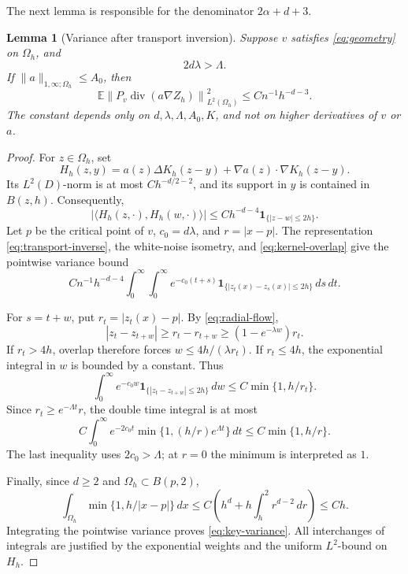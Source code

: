 \documentclass[11pt]{article}
\newtheorem{lemma}[theorem]{Lemma}
\theoremstyle{remark}
\newcommand{\E}{\mathbb E}
\newcommand{\one}{\mathbf 1}
\DeclareMathOperator{\divergence}{div}
\begin{document}
The next lemma is responsible for the denominator \(2\alpha+d+3\).

\begin{lemma}[Variance after transport inversion]\label{lem:variance}
Suppose \(v\) satisfies \eqref{eq:geometry} on \(\Omega_h\), and
\[
2d\lambda>\Lambda.
\]
If \(\|a\|_{1,\infty;\Omega_h}\leq A_0\), then
\begin{equation}\label{eq:key-variance}
\E\left\|P_v\divergence(a\nabla Z_h)\right\|_{L^2(\Omega_h)}^2
\leq Cn^{-1}h^{-d-3}.
\end{equation}
The constant depends only on \(d,\lambda,\Lambda,A_0,K\), and not
on higher derivatives of \(v\) or \(a\).
\end{lemma}

\begin{proof}
For \(z\in\Omega_h\), set
\[
H_h(z,y)=a(z)\Delta K_h(z-y)+\nabla a(z)\cdot\nabla K_h(z-y).
\]
Its \(L^2(D)\)-norm is at most \(Ch^{-d/2-2}\), and its support
in \(y\) is contained in \(B(z,h)\). Consequently,
\begin{equation}\label{eq:kernel-overlap}
|\langle H_h(z,\cdot),H_h(w,\cdot)\rangle|
\leq Ch^{-d-4}\one_{\{|z-w|\leq2h\}}.
\end{equation}
Let \(p\) be the critical point of \(v\), \(c_0=d\lambda\), and
\(r=|x-p|\). The representation \eqref{eq:transport-inverse},
the white-noise isometry, and \eqref{eq:kernel-overlap} give the
pointwise variance bound
\[
Cn^{-1}h^{-d-4}
\int_0^\infty\int_0^\infty
e^{-c_0(t+s)}
\one_{\{|z_t(x)-z_s(x)|\leq2h\}}\,ds\,dt.
\]

For \(s=t+w\), put \(r_t=|z_t(x)-p|\).
By \eqref{eq:radial-flow},
\[
|z_t-z_{t+w}|
\geq r_t-r_{t+w}
\geq (1-e^{-\lambda w})r_t.
\]
If \(r_t>4h\), overlap therefore forces
\(w\leq4h/(\lambda r_t)\). If \(r_t\leq4h\), the exponential
integral in \(w\) is bounded by a constant. Thus
\[
\int_0^\infty e^{-c_0w}
\one_{\{|z_t-z_{t+w}|\leq2h\}}\,dw
\leq C\min\{1,h/r_t\}.
\]
Since \(r_t\geq e^{-\Lambda t}r\), the double time integral is at most
\[
C\int_0^\infty e^{-2c_0t}
\min\{1,(h/r)e^{\Lambda t}\}\,dt
\leq C\min\{1,h/r\}.
\]
The last inequality uses \(2c_0>\Lambda\); at \(r=0\) the minimum
is interpreted as \(1\).

Finally, since \(d\geq2\) and \(\Omega_h\subset B(p,2)\),
\[
\int_{\Omega_h}\min\{1,h/|x-p|\}\,dx
\leq C\left(h^d+h\int_h^2 r^{d-2}\,dr\right)
\leq Ch.
\]
Integrating the pointwise variance proves \eqref{eq:key-variance}.
All interchanges of integrals are justified by the exponential
weights and the uniform \(L^2\)-bound on \(H_h\).
\end{proof}
\end{document}
